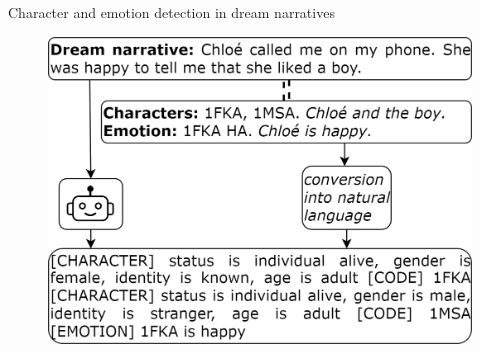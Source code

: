 \documentclass[10pt]{beamer}
\begin{document}
\begin{frame}{Character and emotion detection in dream narratives}



\begin{figure}
    \centering
    \includegraphics[width=0.8\linewidth]{img/dream_method.png}
    \label{fig:placeholder}
\end{figure}


    
\end{frame}
\end{document}
